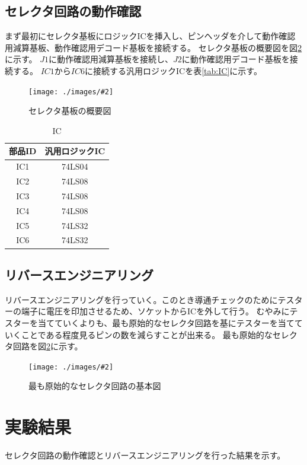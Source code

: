 \documentclass[a4paper,11pt,dvipdfmx]{jsarticle}
\newcommand{\Figure}[4]{
\begin{figure}[H]
\centering
\texttt{[image: ./images/\#2]}
\caption{#3}
\label{fig:#4}
\end{figure}
}
\begin{document}
\subsection{セレクタ回路の動作確認}
まず最初にセレクタ基板にロジックICを挿入し、ピンヘッダを介して動作確認用減算基板、動作確認用デコード基板を接続する。
セレクタ基板の概要図を図\ref{fig:selector}に示す。
$J1$に動作確認用減算基板を接続し、$J2$に動作確認用デコード基板を接続する。
$IC1$から$IC6$に接続する汎用ロジックICを表\ref{tab:IC}に示す。
\Figure{0.8}{kiban.drawio.png}{セレクタ基板の概要図}{selector}
\begin{table}[H]
  \centering
  \caption{IC}
  \begin{tabular}{|c|c|}
    \hline
    部品ID  &  汎用ロジックIC  \\
    \hline
    IC1  &  74LS04  \\
    IC2  &  74LS08  \\
    IC3  &  74LS08  \\
    IC4  &  74LS08  \\
    IC5  &  74LS32  \\
    IC6  &  74LS32  \\
    \hline
  \end{tabular}
\end{table}

\subsection{リバースエンジニアリング}
リバースエンジニアリングを行っていく。このとき導通チェックのためにテスターの端子に電圧を印加させるため、ソケットからICを外して行う。
むやみにテスターを当てていくよりも、最も原始的なセレクタ回路を基にテスターを当てていくことである程度見るピンの数を減らすことが出来る。
最も原始的なセレクタ回路を図\ref{fig:selector}に示す。
\Figure{0.8}{selector.png}{最も原始的なセレクタ回路の基本図}{selector}

\section{実験結果}
セレクタ回路の動作確認とリバースエンジニアリングを行った結果を示す。
\end{document}
